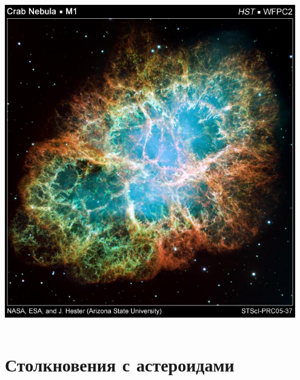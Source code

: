 \documentclass[aspectratio=169]{beamer}
\begin{document}
\begin{frame}
\begin{columns}[c]
{\includegraphics[width=0.95\textwidth]{img/crab_nebula_web_print.jpg}
}
\end{columns}
\end{frame}

\section{Столкновения с астероидами}
\end{document}
